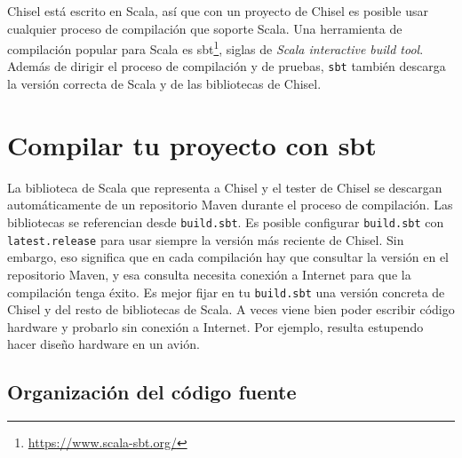 \documentclass[%
    10pt,
    headinclude, footinclude=false,
    openright, %
    notitlepage,
    cleardoublepage=empty,
    headsepline,
    numbers=noenddot,
    bibliography=totoc, index=totoc,
    ]{scrbook}
\newcommand{\code}[1]{{\lstinline[basicstyle=\small\ttfamily]{#1}}}
\newcommand{\myref}[2]{\href{#1}{#2}}
\renewcommand{\myref}[2]{{#2}{\footnote{\url{#1}}}}
\begin{document}
Chisel está escrito en Scala, así que con un proyecto de Chisel es posible usar cualquier proceso de
compilación que soporte Scala. Una herramienta de compilación popular para Scala es
\myref{https://www.scala-sbt.org/}{sbt}, siglas de \emph{Scala interactive build tool}.
Además de dirigir el proceso de compilación y de pruebas, \code{sbt} también descarga la versión
correcta de Scala y de las bibliotecas de Chisel.

\section{Compilar tu proyecto con sbt}



La biblioteca de Scala que representa a Chisel y el tester de Chisel se descargan automáticamente
de un repositorio Maven durante el proceso de compilación.
Las bibliotecas se referencian desde \code{build.sbt}. Es posible configurar \code{build.sbt}
con \code{latest.release} para usar siempre la versión más reciente de Chisel.
Sin embargo, eso significa que en cada compilación hay que consultar la versión en el repositorio
Maven, y esa consulta necesita conexión a Internet para que la compilación tenga éxito.
Es mejor fijar en tu \code{build.sbt} una versión concreta de Chisel y del resto de bibliotecas de Scala.
A veces viene bien poder escribir código hardware y probarlo sin conexión a Internet.
Por ejemplo, resulta estupendo hacer diseño hardware en un avión.

\subsection{Organización del código fuente}
\end{document}
